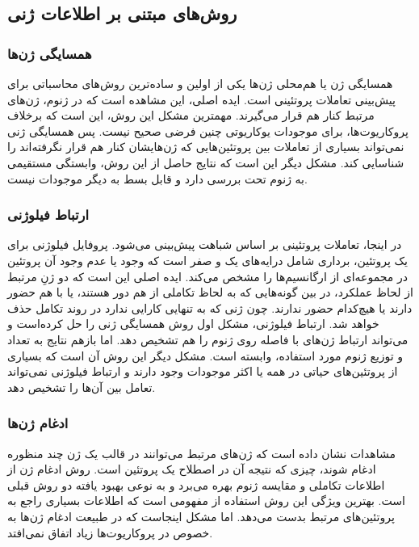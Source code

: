 \subsection{روش‌های مبتنی بر اطلاعات ژنی}
\subsubsection{همسایگی ژن‌ها}
همسایگی ژن یا هم‌محلی ژن‌ها یکی از اولین و ساده‌ترین روش‌های محاسباتی برای پیش‌بینی تعاملات پروتئینی است. ایده اصلی، این مشاهده است که در ژنوم، ژن‌های مرتبط کنار هم قرار می‌گیرند. مهمترین مشکل این روش، این است که برخلاف پروکاریوت‌ها، برای موجودات یوکاریوتی چنین فرضی صحیح نیست. پس همسایگی ژنی نمی‌تواند بسیاری از تعاملات بین پروتئین‌هایی که ژن‌هایشان کنار هم قرار نگرفته‌اند را شناسایی کند. مشکل دیگر این است که نتایج حاصل از این روش، وابستگی مستقیمی به ژنوم تحت بررسی دارد و قابل بسط به دیگر موجودات نیست.

\subsubsection{ارتباط فیلوژنی}
در اینجا، تعاملات پروتئینی بر اساس شباهت  پیش‌بینی می‌شود. پروفایل فیلوژنی برای یک پروتئین، برداری شامل درایه‌های یک و صفر است که وجود یا عدم وجود آن پروتئین در مجموعه‌ای از ارگانسیم‌ها را مشخص می‌کند. ایده اصلی این است که دو ژنِ مرتبط از لحاظ عملکرد، در بین گونه‌هایی که به لحاظ تکاملی از هم دور هستند، یا با هم حضور دارند یا هیچ‌کدام حضور ندارند. چون ژنی که به تنهایی کارایی ندارد در روند تکامل حذف خواهد شد. ارتباط فیلوژنی، مشکل اول روش همسایگی ژنی را حل کرده‌است و می‌تواند ارتباط ژن‌های با فاصله روی ژنوم را هم تشخیص دهد. اما بازهم نتایج به تعداد و توزیع ژنوم مورد استفاده، وابسته است. مشکل دیگر این روش آن است که بسیاری از پروتئین‌های حیاتی در همه یا اکثر موجودات وجود دارند و ارتباط فیلوژنی نمی‌تواند تعامل بین آن‌ها را تشخیص دهد.

\subsubsection{ادغام ژن‌ها}
مشاهدات نشان داده است که ژن‌های مرتبط می‌توانند در قالب یک ژن چند منظوره ادغام شوند، چیزی که نتیجه آن در اصطلاح یک پروتئین  است. روش ادغام ژن از اطلاعات تکاملی و مقایسه ژنوم بهره می‌برد و به نوعی بهبود یافته دو روش قبلی است. بهترین ویژگی این روش استفاده از مفهومی است که اطلاعات بسیاری راجع به پروتئین‌های مرتبط بدست می‌دهد. اما مشکل اینجاست که در طبیعت ادغام ژن‌ها به خصوص در پروکاریوت‌ها زیاد اتفاق نمی‌افتد.

